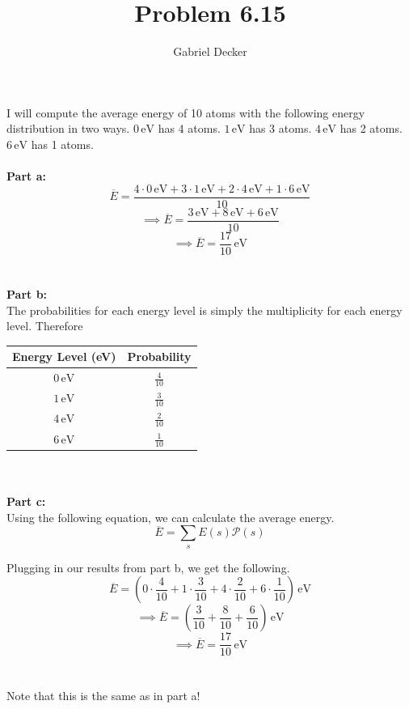 \documentclass[12pt]{article}
\title{Problem 6.15}
\author{Gabriel Decker}
\begin{document}
\maketitle
\begin{flushleft}

I will compute the average energy of 10 atoms with the following energy distribution in two ways.
$0\,\text{eV}$ has 4 atoms.
$1\,\text{eV}$ has 3 atoms.
$4\,\text{eV}$ has 2 atoms.
$6\,\text{eV}$ has 1 atoms.\\~\\


\textbf{Part a:}\\
$$\overline{E}=\frac{4\cdot0\,\text{eV}+3\cdot1\,\text{eV}+2\cdot4\,\text{eV}+1\cdot6\,\text{eV}}{10}$$
$$\implies\overline{E}=\frac{3\,\text{eV}+8\,\text{eV}+6\,\text{eV}}{10}$$
$$\implies\overline{E}=\frac{17}{10}\,\text{eV}$$\\~\\




\textbf{Part b:}\\
The probabilities for each energy level is simply the multiplicity for each energy level. Therefore
\begin{table}[h]
    \centering
    \begin{tabular}{c|c}
        Energy Level (eV) & Probability\\
        \hline
        $0\,\text{eV}$ & $\frac{4}{10}$\\
        $1\,\text{eV}$ & $\frac{3}{10}$\\
        $4\,\text{eV}$ & $\frac{2}{10}$\\
        $6\,\text{eV}$ & $\frac{1}{10}$\\
    \end{tabular}
\end{table}\\~\\



\textbf{Part c:}\\
Using the following equation, we can calculate the average energy.
\begin{equation}
    \overline{E}=\sum_sE(s)\mathcal{P}(s)
\end{equation}

Plugging in our results from part b, we get the following.
$$\overline{E}=\left(0\cdot\frac{4}{10}+1\cdot\frac{3}{10}+4\cdot\frac{2}{10}+6\cdot\frac{1}{10}\right)\,\text{eV}$$
$$\implies\overline{E}=\left(\frac{3}{10}+\frac{8}{10}+\frac{6}{10}\right)\,\text{eV}$$
$$\implies\overline{E}=\frac{17}{10}\,\text{eV}$$\\~\\

Note that this is the same as in part a!


\end{flushleft}
\end{document}

